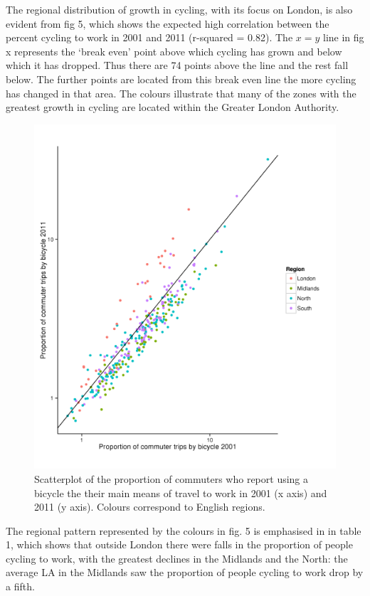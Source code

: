The regional distribution of growth in cycling, with its focus on
London, is also evident from fig 5, which shows the expected high
correlation between the percent cycling to work in 2001 and 2011
(r-squared = 0.82). The $x = y$ line in fig x represents the `break
even' point above which cycling has grown and below which it has
dropped. Thus there are 74 points above the line and the rest fall
below. The further points are located from this break even line the more
cycling has changed in that area. The colours illustrate that many of
the zones with the greatest growth in cycling are located within the
Greater London Authority.

\begin{figure}[htbp]
\centering
\includegraphics{figure/unnamed-chunk-8.png}
\caption{Scatterplot of the proportion of commuters who report using a
bicycle the their main means of travel to work in 2001 (x axis) and 2011
(y axis). Colours correspond to English regions.}
\end{figure}

The regional pattern represented by the colours in fig. 5 is emphasised
in in table 1, which shows that outside London there were falls in the
proportion of people cycling to work, with the greatest declines in the
Midlands and the North: the average LA in the Midlands saw the
proportion of people cycling to work drop by a fifth.

